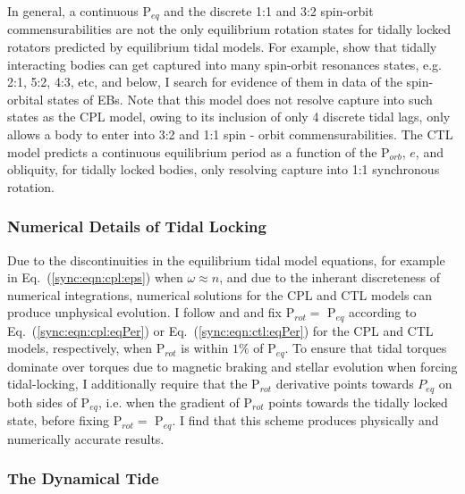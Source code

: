 In general, a continuous P$_{eq}$ and the discrete 1:1 and 3:2 spin-orbit commensurabilities are not the only equilibrium rotation states for tidally locked rotators predicted by equilibrium tidal models. For example, \citet{Rodriguez2012} show that tidally interacting bodies can get captured into many spin-orbit resonances states, e.g. 2:1, 5:2, 4:3, etc, and below, I search for evidence of them in data of the spin-orbital states of \kepler EBs. Note that this model does not resolve capture into such states as the CPL model, owing to its inclusion of only 4 discrete tidal lags, only allows a body to enter into 3:2 and 1:1 spin - orbit commensurabilities. The CTL model predicts a continuous equilibrium period as a function of the P$_{orb}$, $e$, and obliquity, for tidally locked bodies, only resolving capture into 1:1 synchronous rotation.

\subsubsection{Numerical Details of Tidal Locking}

Due to the discontinuities in the equilibrium tidal model equations, for example in Eq.~(\ref{sync:eqn:cpl:eps}) when $\omega \approx n$, and due to the inherant discreteness of numerical integrations, numerical solutions for the CPL and CTL models can produce unphysical evolution. I follow \citet{Barnes2013} and \citet{Fleming2018} and fix P$_{rot} = $ P$_{eq}$ according to Eq.~(\ref{sync:eqn:cpl:eqPer}) or Eq.~(\ref{sync:eqn:ctl:eqPer}) for the CPL and CTL models, respectively, when P$_{rot}$ is within $1\%$ of P$_{eq}$.  To ensure that tidal torques dominate over torques due to magnetic braking and stellar evolution when forcing tidal-locking, I additionally require that the P$_{rot}$ derivative points towards $P_{eq}$ on both sides of P$_{eq}$, i.e. when the gradient of P$_{rot}$ points towards the tidally locked state, before fixing P$_{rot} = $ P$_{eq}$. I find that this scheme produces physically and numerically accurate results. 

\subsubsection{The Dynamical Tide} \label{sync:sec:methods:dynamicalTide}

